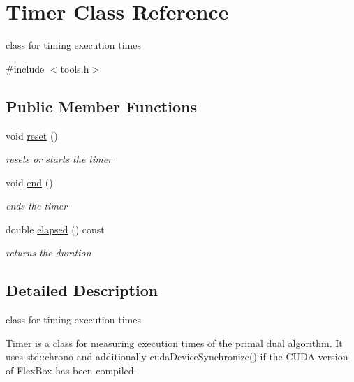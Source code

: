 \hypertarget{class_timer}{}\section{Timer Class Reference}
\label{class_timer}


class for timing execution times  




{\ttfamily \#include $<$tools.\+h$>$}

\subsection*{Public Member Functions}
\begin{DoxyCompactItemize}
\item 
\mbox{\label{class_timer_a9020542d73357a4eef512eefaf57524b}} 
void \hyperlink{class_timer_a9020542d73357a4eef512eefaf57524b}{reset} ()
\begin{DoxyCompactList}\small\item\em resets or starts the timer \end{DoxyCompactList}\item 
\mbox{\label{class_timer_accef2f2b25869fbca2947a56b494d2a0}} 
void \hyperlink{class_timer_accef2f2b25869fbca2947a56b494d2a0}{end} ()
\begin{DoxyCompactList}\small\item\em ends the timer \end{DoxyCompactList}\item 
double \hyperlink{class_timer_a6a89a613c2af9b0d1e5f7e4ba9e46c54}{elapsed} () const
\begin{DoxyCompactList}\small\item\em returns the duration \end{DoxyCompactList}\end{DoxyCompactItemize}


\subsection{Detailed Description}
class for timing execution times 

\hyperlink{class_timer}{Timer} is a class for measuring execution times of the primal dual algorithm. It uses std\+::chrono and additionally cuda\+Device\+Synchronize() if the C\+U\+DA version of Flex\+Box has been compiled. 

